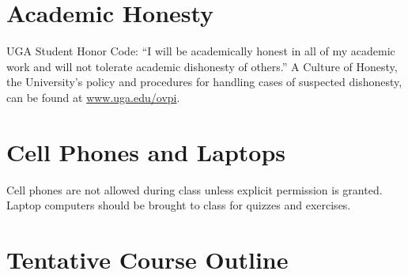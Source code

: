 \documentclass[12pt]{article}
\begin{document}
\section*{\normalsize Academic Honesty}
\vspace{-4mm}
UGA Student Honor Code: ``I will be academically honest in all of my
academic work and will not tolerate academic dishonesty of others.'' A
Culture of Honesty, the University's policy and procedures for
handling cases of suspected dishonesty, can be found at
\url{www.uga.edu/ovpi}.   

\vspace{-2mm}
\section*{\normalsize Cell Phones and Laptops}
\vspace{-4mm}
Cell phones are not allowed during class unless explicit permission is
granted. Laptop computers should be brought to class for quizzes and
exercises.



\section*{Tentative Course Outline}
\end{document}
